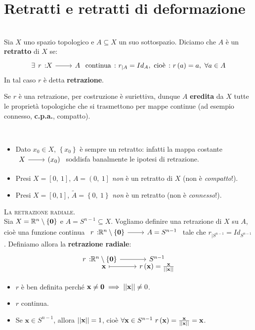 \section{Retratti e retratti di deformazione}
\begin{define}[Retratto.]~{}\\
	Sia $X$ uno spazio topologico e $A\subseteq X$ un suo sottospazio. Diciamo che $A$ è un \textbf{retratto} di $X$ se:
	\begin{equation}
		\exists \funz{r}{X}{A}\text{ continua}\ \colon r_{\mid A}=Id_A,\ \text{cioè}\ \colon r\left(a\right)=a,\ \forall a\in A
	\end{equation}
In tal caso $r$ è detta \textbf{retrazione}.
\end{define}
\begin{observe}
Se $r$ è una retrazione, per costruzione è suriettiva, dunque $A$ \textbf{eredita} da $X$ tutte le proprietà topologiche che si trasmettono per mappe continue (ad esempio connesso, \textbf{c.p.a.}, compatto).
\end{observe}
\begin{examples}~{}
	\begin{itemize}
		\item Dato $x_0\in X$, $\left\{x_0\right\}$ è sempre un retratto: infatti la mappa costante $\funz{\ }{X}{\left(x_0\right)}$ soddisfa banalmente le ipotesi di retrazione.
		\item Presi $X=\left[0,\ 1\right]$, $A=\left(0,\ 1\right]$ \textit{non} è un retratto di $X$ (non è \textit{compatto}!).
		\item Presi $X=\left[0, 1\right]$, $\widetilde{A}=\left\{0,\ 1\right\}$ \textit{non} è un retratto (non è \textit{connesso}!).
	\end{itemize}
\vspace{-3mm}
\end{examples}
\begin{example}\textsc{La retrazione radiale.}\label{retrazioneradiale}\\
	Sia $X=\mathbb{R}^n\setminus \left\{\mathbf{0}\right\}$ e $A=S^{n-1}\subseteq X$. Vogliamo definire una retrazione di $X$ su $A$, cioè una funzione continua $\funz{r}{\realset^n\setminus\left\{\mathbf{0}\right\}}{A=S^{n-1}}$ tale che $r_{\mid S^{n-1}}=Id_{S^{n-1}}$. Definiamo allora la \textbf{retrazione radiale}:
	\begin{equation}
		\funztot{r}{\realset^n\setminus\left\{\mathbf{0}\right\}}{S^{n-1}}{\mathbf{x}}{r\left(\mathbf{x}\right)=\frac{\mathbf{x}}{\labs \mathbf{x}\rabs}}
	\end{equation}
\begin{itemize}
	\item $r$ è ben definita perché $\mathbf{x}\neq\mathbf{0}\implies \left|\left| \mathbf{x}\right|\right|\neq 0$.
	\item $r$ continua.
	\item Se $\mathbf{x}\in S^{n-1}$, allora $\left|\left| \mathbf{x}\right|\right|=1$, cioè $\forall \mathbf{x}\in S^{n-1}\ r\left(\mathbf{x}\right)=\frac{\mathbf{x}}{\labs \mathbf{x}\rabs}=\mathbf{x}$.
\end{itemize}
\vspace{-3mm}
\end{example}
